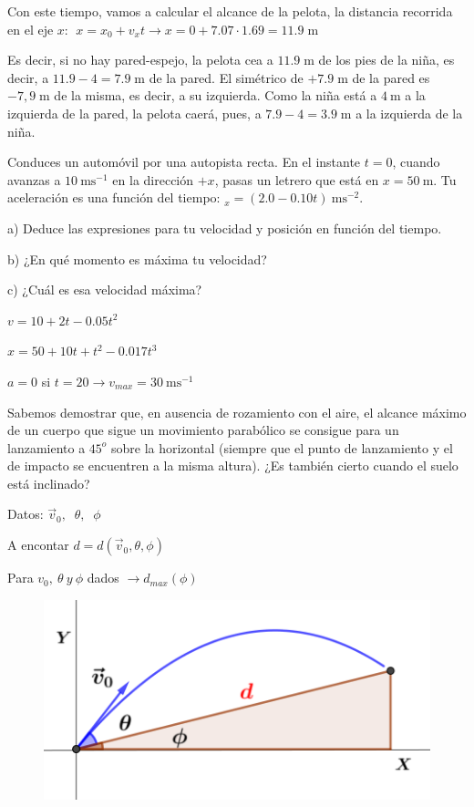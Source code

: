 Con este tiempo, vamos a calcular el alcance de la pelota, la distancia recorrida en el eje $x$: $\; x=x_0+v_xt\to x=0+7.07\cdot 1.69=11.9\;\mathrm{m}$

Es decir, si no hay pared-espejo, la pelota cea a $11.9\;\mathrm{m}$ de los pies de la niña, es decir, a $11.9-4=7.9\;\mathrm{m}$ de la pared.  El simétrico de $+7.9\;\mathrm{m}$ de la pared es $-7,9\;\mathrm{m}$ de la misma, es decir, a su izquierda. Como la niña está a $4\:\mathrm{m}$ a la izquierda de la pared, la pelota caerá, pues, a $7.9-4=3.9\;\mathrm{m}$ a la izquierda de la niña.

\begin{prob}
Conduces un automóvil por una autopista recta. En el instante $t = 0$, cuando avanzas a $10 \ \mathrm{ms}^{-1}$ en la dirección $+x$, pasas un letrero que está en $x= 50 \ \mathrm{m}$. Tu aceleración es una función del tiempo: $_x = (2.0 - 0.10 t)\ \mathrm{ms}^{-2}$. 

a) Deduce las expresiones para tu velocidad y posición en función del tiempo.  

b) ¿En qué momento es máxima tu velocidad?  

c) ¿Cuál es esa velocidad máxima?  
\end{prob}
$v=10+2t-0.05t^2$ 

$x=50+10t+t^2-0.017t^3$

$a=0$ si $t=20 \to v_{max}=30\ \mathrm{ms}^{-1}$	

\begin{prob}
Sabemos demostrar que, en ausencia de rozamiento con el aire, el alcance máximo de un cuerpo que sigue un movimiento parabólico se consigue para un lanzamiento a $45^o$ sobre la horizontal (siempre que el punto de lanzamiento y el de impacto se encuentren a la misma altura). ¿Es también cierto cuando el suelo está inclinado? 
\end{prob}
\begin{multicols}{2}
Datos: $\vec v_0,\;\; \theta,\;\; \phi$

A encontar $d=d(\vec v_0,\theta,\phi)$

Para $v_0, \ \theta \ { y }\  \phi$ dados $\to d_{max}(\phi)$
\begin{figure}[H]
		\centering
		\includegraphics[width=.5\textwidth]{imagenes/imagenes02/T02IM36.png}
		\end{figure}
\end{multicols}

